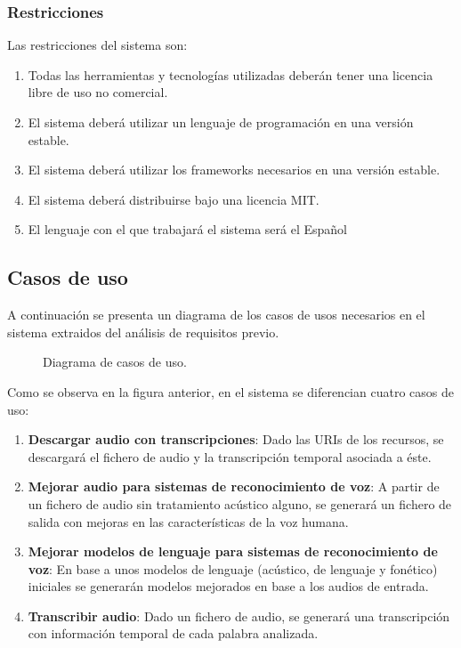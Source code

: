 \documentclass[../main.tex]{subfiles}
\begin{document}
\subsubsection{Restricciones}\label{subsubsec:restricciones}
Las restricciones del sistema son:
\begin{enumerate}
    \item Todas las herramientas y tecnologías utilizadas deberán tener una licencia libre de uso no comercial.
    \item El sistema deberá utilizar un lenguaje de programación en una versión estable.
    \item El sistema deberá utilizar los frameworks necesarios en una versión estable.
    \item El sistema deberá distribuirse bajo una licencia MIT.
    \item El lenguaje con el que trabajará el sistema será el Español
\end{enumerate}

\subsection{Casos de uso}\label{subsec:casos_uso}
A continuación se presenta un diagrama de los casos de usos necesarios en el sistema extraidos del análisis de requisitos previo.

\begin{figure}[H]
    \centering
    
    \label{fig:casos_uso}
    \caption{Diagrama de casos de uso.}
\end{figure}

Como se observa en la figura anterior, en el sistema se diferencian cuatro casos de uso:
\begin{enumerate}
    \item \textbf{Descargar audio con transcripciones}: Dado las URIs de los recursos, se descargará el fichero de audio y la transcripción temporal asociada a éste.
    \item \textbf{Mejorar audio para sistemas de reconocimiento de voz}: A partir de un fichero de audio sin tratamiento acústico alguno, 
    se generará un fichero de salida con mejoras en las características de la voz humana.
    \item \textbf{Mejorar modelos de lenguaje para sistemas de reconocimiento de voz}: En base a unos modelos de lenguaje (acústico, de lenguaje y fonético) iniciales se generarán modelos
    mejorados en base a los audios de entrada.
    \item \textbf{Transcribir audio}: Dado un fichero de audio, se generará una transcripción con información temporal de cada palabra analizada.
\end{enumerate}
\end{document}

